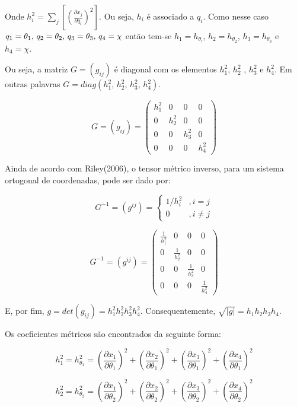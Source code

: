 \documentclass[12pt, a4papper]{article}
\begin{document}
Onde $h_{i}^{2}=\sum_{j}\left[\left(\frac{\partial x_{j}}{\partial q_{i}}\right)^{2}\right]$.
Ou seja, $h_{i}$ é associado a $q_{i}$. Como nesse caso $q_{1}=\theta_{1},\thinspace q_{2}=\theta_{2},\thinspace q_{3}=\theta_{3},\,q_{4}=\chi$
então tem-se $h_{1}=h_{\theta_{!}}$, $h_{2}=h_{\theta_{2}}$, $h_{3}=h_{\theta_{3}}$
e $h_{4}=\chi$.

Ou seja, a matriz $G=(g_{ij})$ é diagonal com os elementos $h_{1}^{2}$,
$h_{2}^{2}$ , $h_{3}^{2}$ e $h_{4}^{2}$. Em outras palavras $G=diag(h_{1}^{2},\,h_{2}^{2},\,h_{3}^{2},\,h_{4}^{2})$.

\[
G=(g_{ij})=\left(\begin{array}{cccc}
h_{1}^{2} & 0 & 0 & 0\\
0 & h_{2}^{2} & 0 & 0\\
0 & 0 & h_{3}^{2} & 0\\
0 & 0 & 0 & h_{4}^{2}
\end{array}\right)
\]

Ainda de acordo com Riley(2006), o tensor métrico inverso, para um
sistema ortogonal de coordenadas, pode ser dado por:

\[
G^{-1}=(g^{ij})=\begin{cases}
1/h_{i}^{2} & ,i=j\\
0 & ,i\neq j
\end{cases}
\]

\[
G^{-1}=(g^{ij})=\left(\begin{array}{cccc}
\frac{1}{h_{1}^{2}} & 0 & 0 & 0\\
0 & \frac{1}{h_{2}^{2}} & 0 & 0\\
0 & 0 & \frac{1}{h_{3}^{2}} & 0\\
0 & 0 & 0 & \frac{1}{h_{4}^{2}}
\end{array}\right)
\]

E, por fim, $g=det(g_{ij})=h_{1}^{2}h_{2}^{2}h_{3}^{2}h_{4}^{2}$.
Consequentemente, $\sqrt{|g|}=h_{1}h_{2}h_{3}h_{4}$.

Os coeficientes métricos são encontrados da seguinte forma:

\[
h_{1}^{2}=h_{\theta_{1}}^{2}=\left(\frac{\partial x_{1}}{\partial\theta_{1}}\right)^{2}+\left(\frac{\partial x_{2}}{\partial\theta_{1}}\right)^{2}+\left(\frac{\partial x_{3}}{\partial\theta_{1}}\right)^{2}+\left(\frac{\partial x_{4}}{\partial\theta_{1}}\right)^{2}
\]

\[
h_{2}^{2}=h_{\theta_{2}}^{2}=\left(\frac{\partial x_{1}}{\partial\theta_{2}}\right)^{2}+\left(\frac{\partial x_{2}}{\partial\theta_{2}}\right)^{2}+\left(\frac{\partial x_{3}}{\partial\theta_{2}}\right)^{2}+\left(\frac{\partial x_{4}}{\partial\theta_{2}}\right)^{2}
\]
\end{document}
